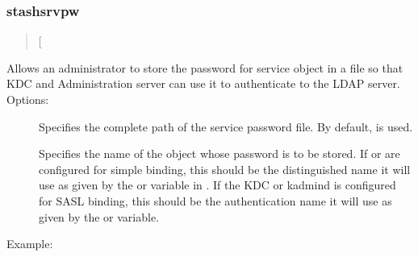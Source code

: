\documentclass[letterpaper,10pt,english]{sphinxmanual}
\begin{document}
\subsubsection{stashsrvpw}
\label{\detokenize{admin/admin_commands/kdb5_ldap_util:stashsrvpw}}\label{\detokenize{admin/admin_commands/kdb5_ldap_util:kdb5-ldap-util-list-end}}\label{\detokenize{admin/admin_commands/kdb5_ldap_util:kdb5-ldap-util-stashsrvpw}}\begin{quote}

\sphinxAtStartPar
{}
{[} \sphinxstyleemphasis{filename}{]}
\end{quote}

\sphinxAtStartPar
Allows an administrator to store the password for service object in a
file so that KDC and Administration server can use it to authenticate
to the LDAP server.  Options:
\begin{description}
\item[{ }] \leavevmode
\sphinxAtStartPar
Specifies the complete path of the service password file. By
default,  is used.

\item[{}] \leavevmode
\sphinxAtStartPar
Specifies the name of the object whose password is to be stored.
If {\hyperref[\detokenize{admin/admin_commands/krb5kdc:krb5kdc-8}]{}} or {\hyperref[\detokenize{admin/admin_commands/kadmind:kadmind-8}]{}} are configured for
simple binding, this should be the distinguished name it will
use as given by the  or 
variable in {\hyperref[\detokenize{admin/conf_files/kdc_conf:kdc-conf-5}]{}}.  If the KDC or kadmind is
configured for SASL binding, this should be the authentication
name it will use as given by the  or
 variable.

\end{description}

\sphinxAtStartPar
Example:

\begin{sphinxVerbatim}[commandchars=\\\{\}]
   
  
   
\end{sphinxVerbatim}
\end{document}
